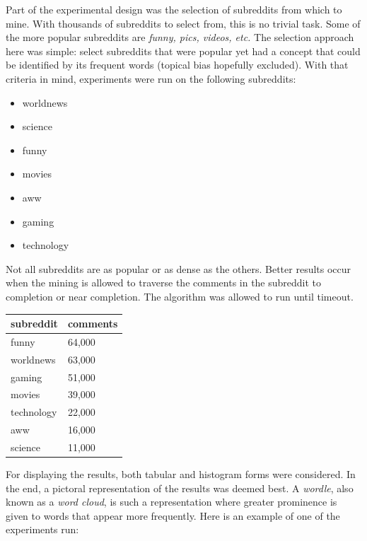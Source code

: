 \documentclass[12pt]{article}
\numberwithin{equation}{section}
\begin{document}
Part of the experimental design was the selection of subreddits from which to mine.  With thousands of subreddits to select from, this is no trivial task.  Some of the more popular subreddits are \textit{funny, pics, videos, etc.}  The selection approach here was simple:  select subreddits that were popular yet had a concept that could be identified by its frequent words (topical bias hopefully excluded).   With that criteria in mind, experiments were run on the following subreddits: 

\begin{itemize} \itemsep1pt \parskip0pt 

  \item worldnews
  \item science
  \item funny
  \item movies
  \item aww
  \item gaming
  \item technology
  
\end{itemize}

Not all subreddits are as popular or as dense as the others.  Better results occur when the mining is allowed to traverse the comments in the subreddit to completion or near completion.  The algorithm was allowed to run until timeout.  

\begin{table}[h!]
\begin{tabular}{ll}
\textbf{subreddit} & \textbf{comments} \\
 \hline
funny              & 64,000           \\
worldnews          & 63,000           \\
gaming             & 51,000           \\
movies             & 39,000           \\
technology         & 22,000           \\
aww                & 16,000           \\
science            & 11,000          
\end{tabular}
\end{table}



For displaying the results, both tabular and histogram forms were considered.  In the end, a pictoral representation of the results was deemed best.  A \textit{wordle}, also known as a \textit{word cloud}, is such a representation where  greater prominence is given to words that appear more frequently.  Here is an example of one of the experiments run: 
\end{document}
